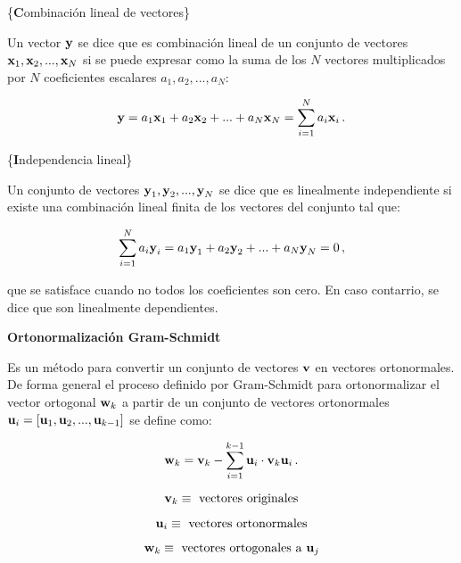 \documentclass[
]{agujournal2019}
\begin{document}
\vspace{0.5cm}

\{\noindent \textbf Combinación lineal de vectores\}

Un vector \({\textbf y}\) se dice que es combinación lineal de un
conjunto de vectores \({\textbf x}_1, {\textbf x}_2, ...,{\textbf x}_N\)
si se puede expresar como la suma de los \(N\) vectores multiplicados
por \(N\) coeficientes escalares \(a_1,a_2,...,a_N\):

\[{\textbf y}=a_1 {\textbf x}_1 + a_2 {\textbf x}_2 +...+a_N {\textbf x}_N=\sum\limits^N_{i=1}a_i {\textbf x}_i\,.\]

\vspace{0.5cm}

\{\noindent \textbf Independencia lineal\}

Un conjunto de vectores
\({\textbf y}_1, {\textbf y}_2, ...,{\textbf y}_N\) se dice que es
linealmente independiente si existe una combinación lineal finita de los
vectores del conjunto tal que:

\[\sum\limits^N_{i=1} a_i {\textbf y}_i=a_1{\textbf y}_1 + a_2{\textbf y}_2+...+a_N{\textbf y}_N=0\,,\]

que se satisface cuando no todos los coeficientes son cero. En caso
contarrio, se dice que son linealmente dependientes.

\vspace{0.5cm}

\textbf{Ortonormalización Gram-Schmidt}

Es un método para convertir un conjunto de vectores \({\textbf v}\) en
vectores ortonormales. De forma general el proceso definido por
Gram-Schmidt para ortonormalizar el vector ortogonal \({\textbf w}_k\) a
partir de un conjunto de vectores ortonormales
\({\textbf u}_i=[{\textbf u}_1, {\textbf u}_2,...,{\textbf u}_{k-1}]\)
se define como:

\[{\textbf w}_k={\textbf v}_k-\sum\limits^{k-1}_{i=1} {\textbf u}_i\cdot{\textbf v}_k{\textbf u}_i\,.\]

\vspace{0.25cm}

\[{\textbf v}_k\equiv\,\,{\rm vectores}\,\,{\rm originales}\]

\[{\textbf u}_i\equiv\,\,{\rm vectores}\,\,{\rm ortonormales}\]

\[{\textbf w}_k\equiv\,\,{\rm vectores}\,\,{\rm ortogonales}\,\,{\rm a}\,\,{\textbf u}_j\]

\vspace{0.25cm}
\end{document}
